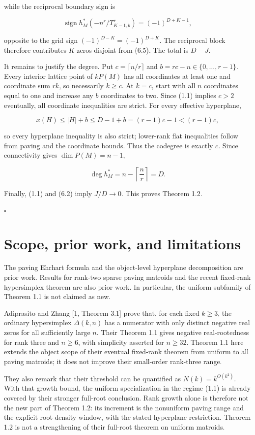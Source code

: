 \documentclass[10pt]{article}
\begin{document}
while the reciprocal boundary sign is

\[
 \operatorname{sign}h_M^*(-n^r/T_{K-1,b}^r)=(-1)^{D+K-1}, \tag{6.7}
\]

opposite to the grid sign $(-1)^{D-K}=(-1)^{D+K}$.  The reciprocal block
therefore contributes $K$ zeros disjoint from (6.5).  The total is $D-J$.

It remains to justify the degree.  Put $c=\lceil n/r\rceil$ and
$b=rc-n\in\{0,\ldots,r-1\}$.  Every interior lattice point of $kP(M)$
has all coordinates at least one and coordinate sum $rk$, so necessarily
$k\ge c$.  At $k=c$, start with all $n$ coordinates equal to one and
increase any $b$ coordinates to two.  Since (1.1) implies $c>2$ eventually,
all coordinate inequalities are strict.  For every effective hyperplane,

\[
 x(H)\le |H|+b\le D-1+b=(r-1)c-1<(r-1)c, \tag{6.8}
\]

so every hyperplane inequality is also strict; lower-rank flat inequalities
follow from paving and the coordinate bounds.  Thus the codegree is exactly
$c$.  Since connectivity gives $\dim P(M)=n-1$,

\[
 \deg h_M^*=n-\left\lceil\frac nr\right\rceil=D. \tag{6.9}
\]

Finally, (1.1) and (6.2) imply $J/D\to0$.  This proves Theorem 1.2.

\hfill$\square$


\section{Scope, prior work, and limitations}


The paving Ehrhart formula and the object-level hyperplane decomposition are
prior work.  Results for rank-two sparse paving matroids and the recent
fixed-rank hypersimplex theorem are also prior work.  In particular, the
uniform subfamily of Theorem 1.1 is not claimed as new.

Adiprasito and Zhang [1, Theorem 3.1] prove that, for each fixed $k\ge3$,
the ordinary hypersimplex $\Delta(k,n)$ has a numerator with only distinct
negative real zeros for all sufficiently large $n$.  Their Theorem 1.1
gives negative real-rootedness for rank three and $n\ge6$, with simplicity
asserted for $n\ge32$.  Theorem 1.1 here extends the object scope of their
eventual fixed-rank theorem from uniform to all paving matroids; it does not
improve their small-order rank-three range.

They also remark that their threshold can be quantified as
$N(k)=k^{O(k^2)}$.  With that growth bound, the uniform specialization in
the regime (1.1) is already covered by their stronger full-root conclusion.
Rank growth alone is therefore not the new part of Theorem 1.2: its increment
is the nonuniform paving range and the explicit root-density window, with the
stated hyperplane restriction.  Theorem 1.2 is not a strengthening of their
full-root theorem on uniform matroids.
\end{document}
